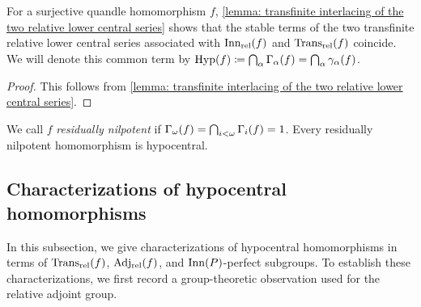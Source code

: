 For a surjective quandle homomorphism $f$, \cref{lemma: transfinite interlacing of the two relative lower central series} shows that the stable terms of the two transfinite relative lower central series associated with $\operatorname{Inn_{rel}}(f)$ and $\operatorname{Trans_{rel}}(f)$ coincide. We will denote this common term by $\textstyle \operatorname{Hyp}(f)\coloneqq \bigcap_\alpha \Gamma_{\alpha}(f) = \bigcap_{\alpha} \gamma_{\alpha}(f)$.


\begin{proof}
This follows from \cref{lemma: transfinite interlacing of the two relative lower central series}.
\end{proof}

\begin{rem}
We call $f$ \emph{residually nilpotent} if $\textstyle \Gamma_{\omega}(f)=\bigcap_{i<\omega}\Gamma_{i}(f)=1$. Every residually nilpotent homomorphism is hypocentral.
\end{rem}




\subsection{Characterizations of hypocentral homomorphisms}
\label{subsection: characterizations of hypocentral homomorphisms}

In this subsection, we give characterizations of hypocentral homomorphisms in terms of $\operatorname{Trans_{rel}}(f)$, $\operatorname{Adj_{rel}}(f)$, and $\operatorname{Inn}(P)$-perfect subgroups.
To establish these characterizations, we first record a group-theoretic observation used for the relative adjoint group.


